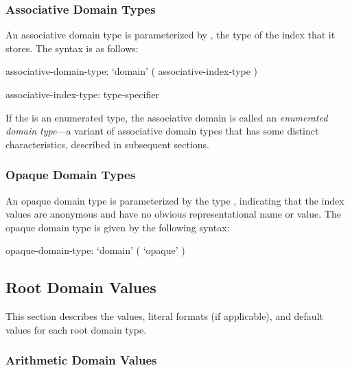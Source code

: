 \subsubsection{Associative Domain Types}
\label{Associative_Domain_Types}

An associative domain type is parameterized by , the
type of the index that it stores.  The syntax is as follows:

\begin{syntax}
associative-domain-type:
  `domain' ( associative-index-type )

associative-index-type:
  type-specifier
\end{syntax}

%
%


If the  is an enumerated type, the
associative domain is called an \emph{enumerated domain type}---a
variant of associative domain types that has some distinct
characteristics, described in subsequent sections.


\subsubsection{Opaque Domain Types}
\label{Opaque_Domain_Types}

An opaque domain type is parameterized by the type ,
indicating that the index values are anonymous and have no obvious
representational name or value.  The opaque domain type is given by
the following syntax:

\begin{syntax}
opaque-domain-type:
  `domain' ( `opaque' )
\end{syntax}


\subsection{Root Domain Values}
\label{Root_Domain_Values}
\label{Root_Domain Literals}
\label{Root_Default_Domain_Values}

This section describes the values, literal formats (if applicable),
and default values for each root domain type.

\subsubsection{Arithmetic Domain Values}
\label{Arithmetic_Domain_Values}

